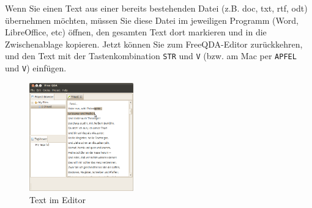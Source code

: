 Wenn Sie einen Text aus einer bereits bestehenden Datei (z.B. doc, txt, rtf, odt) übernehmen möchten, müssen Sie diese Datei im jeweiligen %
Programm (Word, LibreOffice, etc) öffnen, den gesamten Text dort markieren und in die Zwischenablage kopieren. Jetzt können Sie zum %
FreeQDA-Editor zurückkehren, und den Text mit der Tastenkombination \texttt{STR} und \texttt{V} (bzw. am Mac per  \texttt{APFEL} %
und \texttt{V}) einfügen. 
\begin{figure}[!htb]
	\centering
	 \includegraphics[width=0.4\textwidth]{img/Faust1}
	\caption{Text im Editor}
	\label{fig:faust}
\end{figure}
\vfill

